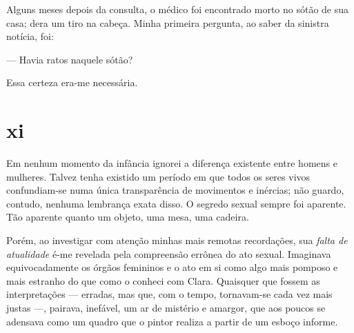 Alguns meses depois da consulta, o médico foi encontrado morto no sótão de sua
casa; dera um tiro na cabeça. Minha primeira pergunta, ao saber da sinistra
notícia, foi:

--- Havia ratos naquele sótão?

Essa certeza era-me necessária.


\section{xi} 

 

Em nenhum momento da infância ignorei a diferença existente entre homens e
mulheres. Talvez tenha existido um período em que todos os seres vivos
confundiam-se numa única transparência de movimentos e inércias; não guardo,
contudo, nenhuma lembrança exata disso. O segredo sexual sempre foi aparente.
Tão aparente quanto um objeto, uma mesa, uma cadeira.

Porém, ao investigar com atenção minhas mais remotas recordações, sua \textit
{falta de atualidade} é-me revelada pela compreensão errônea do ato sexual.
Imaginava equivocadamente os órgãos femininos e o ato em si como algo mais
pomposo e mais estranho do que como o conheci com Clara. Quaisquer que fossem
as interpretações --- erradas, mas que, com o tempo, tornavam-se cada vez
mais justas ---, pairava, inefável, um ar de mistério e amargor, que aos
poucos se adensava como um quadro que o pintor realiza a partir de um esboço
informe.

